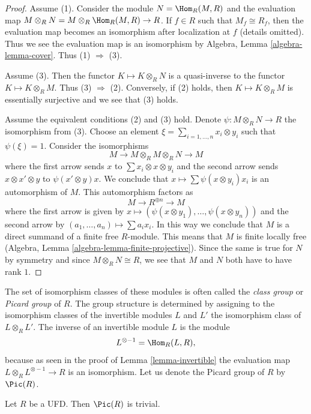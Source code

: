 \begin{proof}
Assume (1). Consider the module $N = \Hom_R(M, R)$ and the evaluation
map $M \otimes_R N = M \otimes_R \Hom_R(M, R) \to R$. If $f \in R$
such that $M_f \cong R_f$, then the evaluation map becomes an isomorphism
after localization at $f$ (details omitted). Thus we see the evaluation
map is an isomorphism by Algebra, Lemma \ref{algebra-lemma-cover}.
Thus (1) $\Rightarrow$ (3).

\medskip\noindent
Assume (3). Then the functor $K \mapsto K \otimes_R N$ is a quasi-inverse
to the functor $K \mapsto K \otimes_R M$. Thus (3) $\Rightarrow$ (2).
Conversely, if (2) holds, then $K \mapsto K \otimes_R M$ is essentially
surjective and we see that (3) holds.

\medskip\noindent
Assume the equivalent conditions (2) and (3) hold. Denote
$\psi : M \otimes_R N \to R$ the isomorphism from (3).
Choose an element $\xi = \sum_{i = 1, \ldots, n} x_i \otimes y_i$
such that $\psi(\xi) = 1$. Consider the isomorphisms
$$
M \to M \otimes_R M \otimes_R N \to M
$$
where the first arrow sends $x$ to $\sum x_i \otimes x \otimes y_i$
and the second arrow sends $x \otimes x' \otimes y$ to $\psi(x' \otimes y)x$.
We conclude that $x \mapsto \sum \psi(x \otimes y_i)x_i$ is
an automorphism of $M$. This automorphism factors as
$$
M \to R^{\oplus n} \to M
$$
where the first arrow is given by
$x \mapsto (\psi(x \otimes y_1), \ldots, \psi(x \otimes y_n))$
and the second arrow by $(a_1, \ldots, a_n) \mapsto \sum a_i x_i$.
In this way we conclude that $M$ is a direct summand of a finite free
$R$-module. This means that $M$ is finite locally free
(Algebra, Lemma \ref{algebra-lemma-finite-projective}).
Since the same is true for $N$ by symmetry and since
$M \otimes_R N \cong R$, we see that
$M$ and $N$ both have to have rank $1$.
\end{proof}

\noindent
The set of isomorphism classes of these
modules is often called the {\it class group} or {\it Picard group}
of $R$. The group structure is determined by assigning to
the isomorphism classes of the invertible modules $L$ and $L'$
the isomorphism class of $L \otimes_R L'$.
The inverse of an invertible module $L$ is the module
$$
L^{\otimes -1} = \Hom_R(L, R),
$$
because as seen in the proof of Lemma \ref{lemma-invertible}
the evaluation map $L \otimes_R L^{\otimes -1} \to R$ is an isomorphism.
Let us denote the Picard group of $R$ by $\Pic(R)$.

\begin{lemma}
\label{lemma-UFD-Pic-trivial}
Let $R$ be a UFD. Then $\Pic(R)$ is trivial.
\end{lemma}

